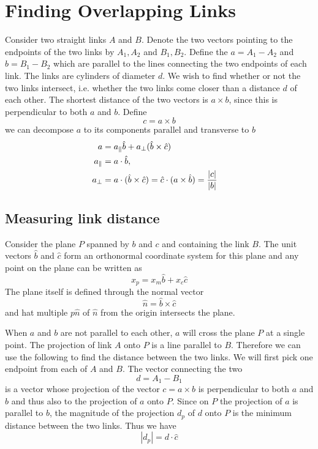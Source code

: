 \documentclass[nofootinbib,preprint,floatfix,titlepage,superscriptaddress]{revtex4} %
\begin{document}



\section{Finding Overlapping Links}
Consider two straight links $A$ and $B$. Denote the two vectors pointing to the endpoints of the two links by $A_1,A_2$ and $B_1,B_2$. Define the $a= A_1 - A_2$ and $ b= B_1 -B_2$ which are parallel to the lines connecting the two endpoints of each link. The links are cylinders of diameter $d$. We wish to find whether or not the two links intersect, i.e. whether the two links come closer than a distance $d$ of each other. The shortest distance of the two vectors is $a \times b$, since this is perpendicular to both $a$ and $b$. Define
\[c = a\times b\]
we can decompose $ a$ to its components parallel and transverse to $b$ 
\begin{align}
a &= a_\parallel \hat{b}+ a_\perp (\hat{b}\times \hat{c})\cr
a_\parallel &= a\cdot \hat{b}, \cr
a_\perp &= a \cdot (\hat{b}\times \hat{c}) = \hat{c} \cdot (a\times \hat{b})= {|c|\over |b|}
\end{align}

\subsection{Measuring link distance}
Consider the plane $P$ spanned by $b$ and $c$ and containing the link $B$. The unit vectors $\hat{b}$ and $\hat{c}$ form an orthonormal coordinate system for this plane and any point on the plane can be written as
\[x_p = x_m \hat{b}+ x_c\hat{c}\]
The plane itself is defined through the normal vector 
\[\hat{n}= \hat{b}\times\hat{c}\]
and hat multiple $p\hat{n}$ of $\hat{n}$ from the origin intersects the plane.

When $ a$ and $b$ are not parallel to each other, $a$ will cross the plane $P$ at a single point. The projection of link $A$ onto $P$ is a line parallel to $B$. Therefore we can use the following to find the distance between the two links. We will first pick one endpoint from each of $A$ and $B$. The vector connecting the two
\[d = A_1-B_1\]
is a vector whose projection of the vector $c = a\times b$ is perpendicular to both $a$ and $b$ and thus also to the projection of $a$ onto $P$. Since on $P$ the projection of $a$ is parallel to $b$, the magnitude of the projection $d_p$ of $d$ onto $P$ is the minimum distance between the two links. Thus we have
\[|d_p| = d \cdot \hat{c}\]
\end{document}
